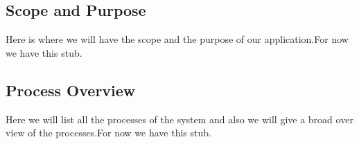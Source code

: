 \subsection{Scope and Purpose}
Here is where we will have the scope and the purpose of
our application.For now we have this stub.
\subsection{Process Overview }
Here we will list all the processes of the system and also
we will give a broad over view of the processes.For now we have
this stub.